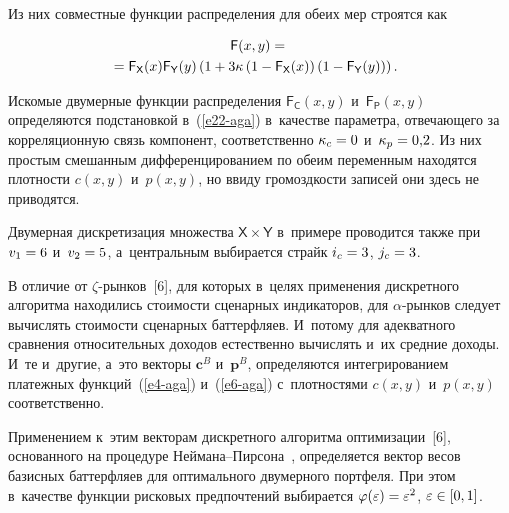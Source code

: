 \begin{multicols}{2}
  \vspace*{-2pt}
  
  \noindent
  Из них совместные функции распределения для обеих мер строятся как
  
  \vspace*{-5pt}
  
  \noindent 
  \begin{multline}
  {\mathsf F}(x,y)={}\\
\hspace*{-3mm}  {}= {\mathsf F}_{\mathsf X}(x) {\mathsf F}_{\mathsf Y}(y) \left( 
1+3\kappa \left( 1-{\mathsf F}_{\mathsf X}(x)\right) \left(1-{\mathsf F}_{\mathsf 
Y}(y)\right)\right).
  \label{e22-aga}
  \end{multline}
  
\vspace*{-1pt}
 
  Искомые двумерные функции распределения ${\mathsf F}_{\mathsf C}(x,y)$ 
и~${\mathsf F}_{\mathsf P} (x,y)$ определяются подстановкой в~(\ref{e22-aga}) 
в~качестве параметра, отвечающего за корреляционную связь компонент, 
соответственно $\kappa_c\hm=0$ и~$\kappa_p\hm=0{,}2$. Из них простым 
смешанным дифференцированием по обеим переменным находятся плотности 
$c(x,y)$ и~$p(x,y)$, но ввиду громоздкости записей они здесь не приводятся. 
  
  Двумерная дискретизация множества ${\mathsf X}\times \mathsf{Y}$ 
в~примере проводится также при $v_1\hm=6$ и~$v_2\hm=5$, а~центральным 
выбирается страйк $i_c\hm=3$, $j_c\hm=3$. 
  
  В отличие от $\zeta$-рын\-ков~[6], для которых в~целях применения 
дискретного алгоритма находились стоимости сценарных индикаторов, для  
\mbox{$\alpha$-рын}\-ков следует вычислять стоимости сценарных баттерфляев. И~потому 
для адекватного сравнения относительных доходов естественно вычислять и~их 
средние доходы. И~те и~другие, а~это векторы $\bm{c}^B$ и~$\bm{p}^B$, 
определяются интегрированием платежных функций~(\ref{e4-aga})  
и~(\ref{e6-aga}) с~плотностями $c(x,y)$ и~$p(x,y)$ соответственно. 
  
  Применением к~этим векторам дискретного алгоритма оптимизации~[6], 
основанного на процедуре Ней\-ма\-на--Пир\-со\-на~\cite{7-aga}, определяется 
вектор весов базисных баттерфляев для оптимального двумерного портфеля. 
При этом в~качестве функции рисковых предпочтений выбирается 
$\varphi(\varepsilon)\hm=\varepsilon^2$, $\varepsilon\hm\in [0,1]$.


\end{multicols}
